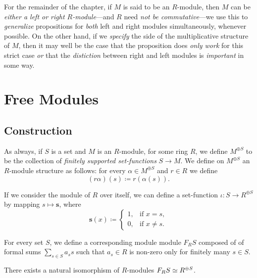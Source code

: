 \begin{remark}
\label{rem:R-modules-convension}
For the remainder of the chapter, if \(M\) is said to be an \(R\)-module, then
\(M\) can be \emph{either a left or right \(R\)-module}---and \(R\) need
\emph{not be commutative}---we use this to \emph{generalize} propositions for
\emph{both} left and right modules simultaneously, whenever possible. On the
other hand, if we \emph{specify} the side of the multiplicative structure of
\(M\), then it may well be the case that the proposition does \emph{only work}
for this strict case \emph{or} that the \emph{distiction} between right and left
modules is \emph{important} in some way.
\end{remark}

\section{Free Modules}

\subsection{Construction}

As always, if \(S\) is a set and \(M\) is an \(R\)-module, for some ring \(R\),
we define \(M^{\oplus S}\) to be the collection of \emph{finitely supported
  set-functions} \(S \to M\). We define on \(M^{\oplus S}\) an \(R\)-module
structure as follows: for every \(\alpha \in M^{\oplus S}\) and \(r \in R\) we
define
\[
(r \alpha)(s) \coloneq r (\alpha(s)).
\]

If we consider the module of \(R\) over itself, we can define a set-function
\(\iota: S \to R^{\oplus S}\) by mapping \(s \mapsto \mathbf{s}\), where
\[
\mathbf{s}(x) \coloneq
\begin{cases}
  1, &\text{if } x = s, \\
  0, &\text{if } x \neq s.
\end{cases}
\]

For every set \(S\), we define a corresponding module module \(F_R S\) composed
of of formal sums \(\sum_{s \in S} a_s s\) such that \(a_s \in R\) is non-zero
only for finitely many \(s \in S\).

\begin{proposition}
\label{prop:free-module-structure-isomorphism}
There exists a natural isomorphism of \(R\)-modules \(F_R S \simeq R^{\oplus S}\).
\end{proposition}

